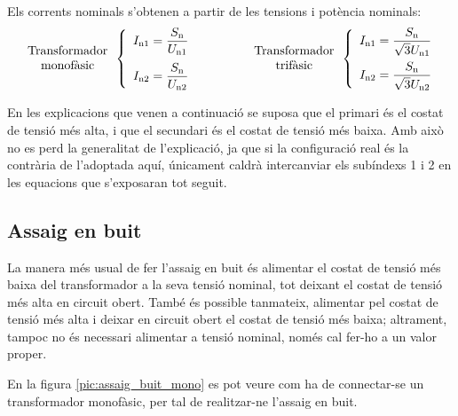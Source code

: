 Els corrents nominals s'obtenen a partir de les tensions i potència
nominals:
\begin{equation}
\begin{array}{c}\text{Transformador}\\
\text{monofàsic}
\end{array} \left\{
\begin{array}{l}
   I_\mathrm{n1} = \dfrac{S_\mathrm{n}}{U_\mathrm{n1}} \\[2.7ex]
   I_\mathrm{n2} = \dfrac{S_\mathrm{n}}{U_\mathrm{n2}}
\end{array}
\right. \qquad\qquad
\begin{array}{c}\text{Transformador}\\
\text{trifàsic}
\end{array} \left\{
\begin{array}{l}
   I_\mathrm{n1} = \dfrac{S_\mathrm{n}}{\sqrt{3}U_\mathrm{n1}} \\[2.5ex]
   I_\mathrm{n2} = \dfrac{S_\mathrm{n}}{\sqrt{3}U_\mathrm{n2}}
\end{array}
\right.
\end{equation}

En les explicacions que venen a continuació se suposa que el
primari és el costat de tensió més alta, i que el secundari és el costat de tensió més baixa. Amb això no es perd la generalitat de
l'explicació, ja que si la configuració real és la contrària de l'adoptada aquí, únicament caldrà intercanviar els subíndexs 1 i 2 en
les equacions que s'exposaran tot seguit.

\subsection{Assaig en buit}

La manera més usual de fer l'assaig en buit és alimentar el costat
de  tensió més baixa del transformador a  la seva tensió nominal, tot
deixant el costat de tensió més alta en circuit obert. També és possible
tanmateix, alimentar pel costat de tensió més alta i deixar en circuit
obert el costat de  tensió més baixa; altrament, tampoc no és necessari
alimentar a tensió nominal, només cal fer-ho a un valor proper.

En la figura \vref{pic:assaig_buit_mono} es pot veure com ha de
connectar-se un transformador monofàsic, per tal de realitzar-ne
l'assaig en buit.

\begin{center}
    
    \label{pic:assaig_buit_mono}
\end{center}

